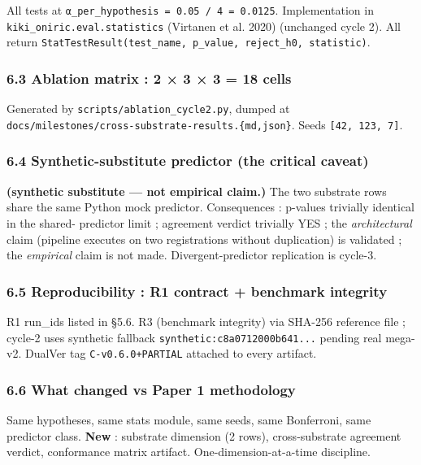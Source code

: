 \documentclass[
]{article}
\begin{document}
All tests at \texttt{α\_per\_hypothesis\ =\ 0.05\ /\ 4\ =\ 0.0125}.
Implementation in \texttt{kiki\_oniric.eval.statistics} ({Virtanen et
al.} 2020) (unchanged cycle 2). All return
\texttt{StatTestResult(test\_name,\ p\_value,\ reject\_h0,\ statistic)}.

\subsubsection{6.3 Ablation matrix : 2 × 3 × 3 = 18
cells}\label{ablation-matrix-2-3-3-18-cells}

Generated by \texttt{scripts/ablation\_cycle2.py}, dumped at
\texttt{docs/milestones/cross-substrate-results.\{md,json\}}. Seeds
\texttt{{[}42,\ 123,\ 7{]}}.

\subsubsection{6.4 Synthetic-substitute predictor (the critical
caveat)}\label{synthetic-substitute-predictor-the-critical-caveat}

\textbf{(synthetic substitute --- not empirical claim.)} The two
substrate rows share the same Python mock predictor. Consequences :
p-values trivially identical in the shared- predictor limit ; agreement
verdict trivially YES ; the \emph{architectural} claim (pipeline
executes on two registrations without duplication) is validated ; the
\emph{empirical} claim is not made. Divergent-predictor replication is
cycle-3.

\subsubsection{6.5 Reproducibility : R1 contract + benchmark
integrity}\label{reproducibility-r1-contract-benchmark-integrity}

R1 run\_ids listed in §5.6. R3 (benchmark integrity) via SHA-256
reference file ; cycle-2 uses synthetic fallback
\texttt{synthetic:c8a0712000b641...} pending real mega-v2. DualVer tag
\texttt{C-v0.6.0+PARTIAL} attached to every artifact.

\subsubsection{6.6 What changed vs Paper 1
methodology}\label{what-changed-vs-paper-1-methodology}

Same hypotheses, same stats module, same seeds, same Bonferroni, same
predictor class. \textbf{New} : substrate dimension (2 rows),
cross-substrate agreement verdict, conformance matrix artifact.
One-dimension-at-a-time discipline.
\end{document}
